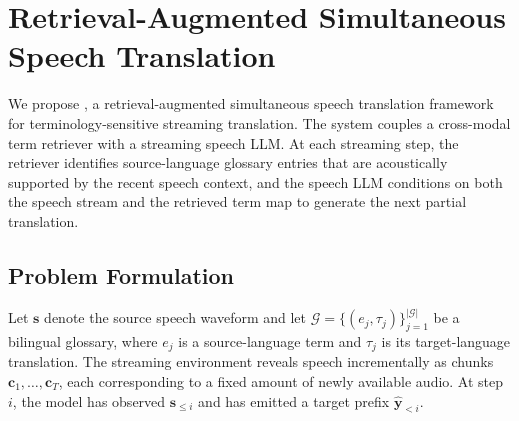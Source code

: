 
\section{Retrieval-Augmented Simultaneous Speech Translation}
\label{sec:method}

We propose \method, a retrieval-augmented simultaneous speech translation framework for terminology-sensitive streaming translation.  The system couples a cross-modal term retriever with a streaming speech LLM.  At each streaming step, the retriever identifies source-language glossary entries that are acoustically supported by the recent speech context, and the speech LLM conditions on both the speech stream and the retrieved term map to generate the next partial translation.

\subsection{Problem Formulation}
\label{sec:problem_formulation}

Let $\mathbf{s}$ denote the source speech waveform and let $\mathcal{G}=\{(e_j,\tau_j)\}_{j=1}^{|\mathcal{G}|}$ be a bilingual glossary, where $e_j$ is a source-language term and $\tau_j$ is its target-language translation.  The streaming environment reveals speech incrementally as chunks $\mathbf{c}_1,\ldots,\mathbf{c}_T$, each corresponding to a fixed amount of newly available audio.  At step $i$, the model has observed $\mathbf{s}_{\le i}$ and has emitted a target prefix $\hat{\mathbf{y}}_{<i}$.

